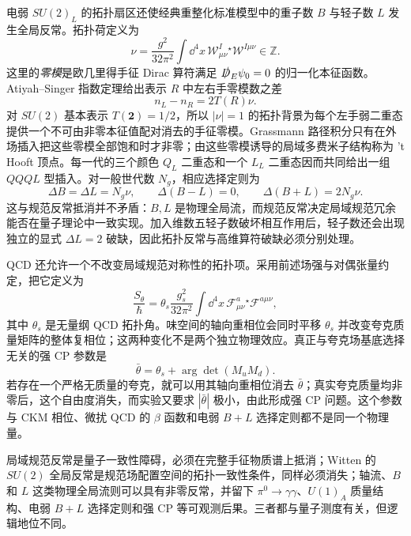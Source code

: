 \begin{proposition}
电弱 $SU(2)_L$ 的拓扑扇区还使经典重整化标准模型中的重子数 $B$ 与轻子数 $L$ 发生全局反常。拓扑荷定义为
\begin{equation}
{
 \nu=\frac{g^2}{32\pi^2}
 \int\dd^4 x\,
 \mathcal W_{\mu\nu}^I{}^\star\!\mathcal W^{I\mu\nu}
 \in\mathbb Z.}
\label{eq:electroweak-topological-charge-dp68}
\end{equation}
这里的\emph{零模}是欧几里得手征 Dirac 算符满足 $\slashed D_E\psi_0=0$ 的归一化本征函数。Atiyah--Singer 指数定理给出表示 $R$ 中左右手零模数之差
\begin{equation*}
 n_L-n_R=2T(R)\nu.
\end{equation*}
对 $SU(2)$ 基本表示 $T(\mathbf2)=1/2$，所以 $|\nu|=1$ 的拓扑背景为每个左手弱二重态提供一个不可由非零本征值配对消去的手征零模。Grassmann 路径积分只有在外场插入把这些零模全部饱和时才非零；由这些零模诱导的局域多费米子结构称为 't Hooft 顶点。每一代的三个颜色 $Q_L$ 二重态和一个 $L_L$ 二重态因而共同给出一组 $QQQL$ 型插入。对一般世代数 $N_g$，相应选择定则为
\begin{equation}
 {
 \Delta B=\Delta L=N_g\nu,\qquad
 \Delta(B-L)=0,\qquad
 \Delta(B+L)=2N_g\nu.}
 \label{eq:sm-bplusl-selection-dp32}
\end{equation}
这与规范反常抵消并不矛盾：$B,L$ 是物理全局流，而规范反常决定局域规范冗余能否在量子理论中一致实现。加入维数五轻子数破坏相互作用后，轻子数还会出现独立的显式 $\Delta L=2$ 破缺，因此拓扑反常与高维算符破缺必须分别处理。
\end{proposition}

\begin{definition}[与味基无关的强 $CP$ 角]
QCD 还允许一个不改变局域规范对称性的拓扑项。采用前述场强与对偶张量约定，把它定义为
\begin{equation}
 {
 \frac{S_{\theta}}{\hbar}
 =\theta_s\frac{g_s^2}{32\pi^2}
 \int\dd^4x\,
 \mathcal F_{\mu\nu}^a{}^\star\!\mathcal F^{a\mu\nu},}
 \label{eq:qcd-theta-action-dp89}
\end{equation}
其中 $\theta_s$ 是无量纲 QCD 拓扑角。味空间的轴向重相位会同时平移 $\theta_s$ 并改变夸克质量矩阵的整体复相位；这两种变化不是两个独立物理效应。真正与夸克场基底选择无关的强 CP 参数是
\begin{equation}
 {
 \bar\theta=\theta_s+\arg\det(M_uM_d).}
 \label{eq:strong-cp-theta-bar-dp11}
\end{equation}
若存在一个严格无质量的夸克，就可以用其轴向重相位消去 $\bar\theta$；真实夸克质量均非零后，这个自由度消失，而实验又要求 $|\bar\theta|$ 极小，由此形成强 CP 问题。这个参数与 CKM 相位、微扰 QCD 的 $\beta$ 函数和电弱 $B+L$ 选择定则都不是同一个物理量。
\end{definition}

局域规范反常是量子一致性障碍，必须在完整手征物质谱上抵消；Witten 的 $SU(2)$ 全局反常是规范场配置空间的拓扑一致性条件，同样必须消失；轴流、$B$ 和 $L$ 这类物理全局流则可以具有非零反常，并留下 $\pi^0\to\gamma\gamma$、$U(1)_A$ 质量结构、电弱 $B+L$ 选择定则和强 CP 等可观测后果。三者都与量子测度有关，但逻辑地位不同。




